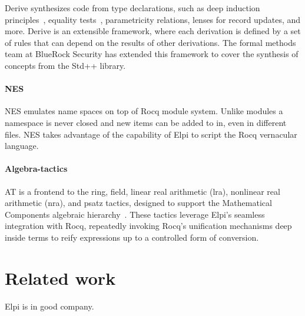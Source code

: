 \documentclass[sigplan,natbib=false]{acmart}
\begin{document}
Derive synthesizes code from type declarations, such as deep induction
principles~\cite{tassi:hal-01897468}, equality
tests~\cite{gregoire:hal-03800154}, parametricity relations, lenses for record
updates, and more. Derive is an extensible framework, where each derivation is
defined by a set of rules that can depend on the results of other derivations.
The formal methods team at BlueRock Security has extended this framework to
cover the synthesis of concepts from the Std++ library.

\paragraph{NES}
NES emulates name spaces on top of Rocq module system. Unlike modules a namespace
is never closed and new items can be added to in, even in different files. NES
takes advantage of the capability of Elpi to script the Rocq vernacular
language.

\paragraph{Algebra-tactics} AT
is a frontend to the ring, field, linear real arithmetic (lra),
nonlinear real arithmetic (nra), and psatz tactics, designed to support the
Mathematical Components algebraic
hierarchy~\cite{sakaguchi:LIPIcs.ITP.2022.29}. These tactics leverage Elpi's
seamless integration with Rocq, repeatedly invoking Rocq's unification mechanisms
deep inside terms to reify expressions up to a controlled form of conversion.

\section{Related work}

Elpi is in good company.
\end{document}
